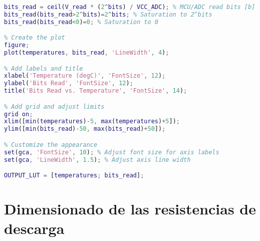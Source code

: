\begin{lstlisting}[language=Matlab, basicstyle=\ttfamily\small, breaklines=true, frame=single]
bits_read = ceil(V_read * (2^bits) / VCC_ADC); % MCU/ADC read bits [b]
bits_read(bits_read>2^bits)=2^bits; % Saturation to 2^bits
bits_read(bits_read<0)=0; % Saturation to 0

% Create the plot
figure;
plot(temperatures, bits_read, 'LineWidth', 4);

% Add labels and title
xlabel('Temperature (degC)', 'FontSize', 12);
ylabel('Bits Read', 'FontSize', 12);
title('Bits Read vs. Temperature', 'FontSize', 14);

% Add grid and adjust limits
grid on;
xlim([min(temperatures)-5, max(temperatures)+5]);
ylim([min(bits_read)-50, max(bits_read)+50]);

% Customize the appearance
set(gca, 'FontSize', 10); % Adjust font size for axis labels
set(gca, 'LineWidth', 1.5); % Adjust axis line width

OUTPUT_LUT = [temperatures; bits_read];

\end{lstlisting}

\section{Dimensionado de las resistencias de descarga}

